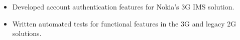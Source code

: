 \begin{itemize}
  \item Developed account authentication features for Nokia's 3G IMS solution.
  \item Written automated tests for functional features in the 3G and legacy 2G solutions.
\end{itemize}
\divider

